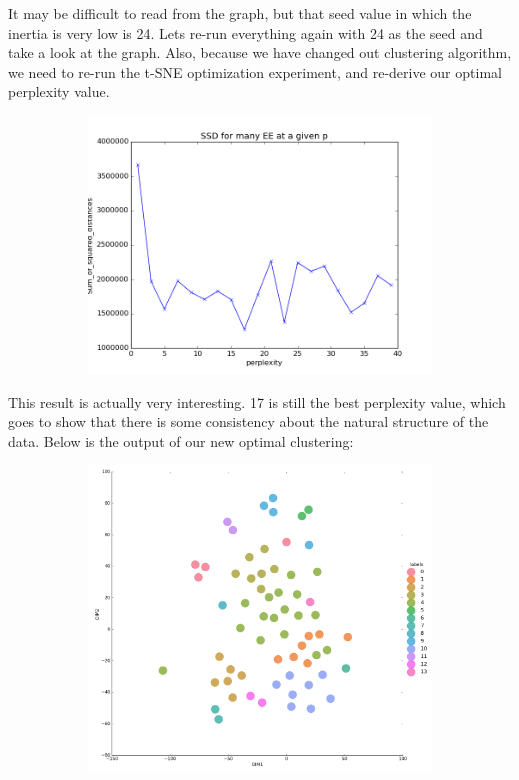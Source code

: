 \documentclass[20pt]{article} %
\begin{document}
\newpage
It may be difficult to read from the graph, but that seed value in which the inertia is very low is 24.  Lets re-run everything again with 24 as the seed and take a look at the graph. Also, because we have changed out clustering algorithm, we need to re-run the t-SNE optimization experiment, and re-derive our optimal perplexity value.
\begin{figure}[!htbp]
  	\centering
   	\begin{subfigure}[p]{0.5\linewidth}
    	\includegraphics[width=\linewidth]{./figures/best_perp1.png}
   	\end{subfigure}
\end{figure}
This result is actually very interesting.  17 is still the best perplexity value, which goes to show that there is some consistency about the natural structure of the data. Below is the output of our new optimal clustering:
\begin{figure}[!htbp]
  	\centering
   	\begin{subfigure}[p]{0.7\linewidth}
    	\includegraphics[width=\linewidth]{./figures/best_seed_tsne.png}
   	\end{subfigure}
\end{figure}
\end{document}
